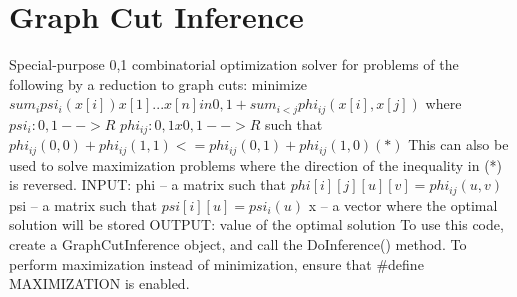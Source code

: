 \documentclass[11pt, oneside]{article}
\begin{document}
\section{Graph Cut Inference}
Special-purpose {0,1} combinatorial optimization solver for
problems of the following by a reduction to graph cuts:
       minimize         $sum_i  psi_i(x[i])  x[1]...x[n] in {0,1}      + sum_{i < j}  phi_{ij}(x[i], x[j])$
where
     $psi_i : {0, 1} --> R$
$  phi_{ij} : {0, 1} x {0, 1} --> R$
such that
  $phi_{ij}(0,0) + phi_{ij}(1,1) <= phi_{ij}(0,1) + phi_{ij}(1,0)  (*)$
This can also be used to solve maximization problems where the
direction of the inequality in (*) is reversed.
INPUT: phi -- a matrix such that $phi[i][j][u][v] = phi_{ij}(u, v)$
       psi -- a matrix such that $psi[i][u] = psi_i(u)$
       x -- a vector where the optimal solution will be stored
OUTPUT: value of the optimal solution
To use this code, create a GraphCutInference object, and call the
DoInference() method.  To perform maximization instead of minimization,
ensure that \#define MAXIMIZATION is enabled.
\end{document}
